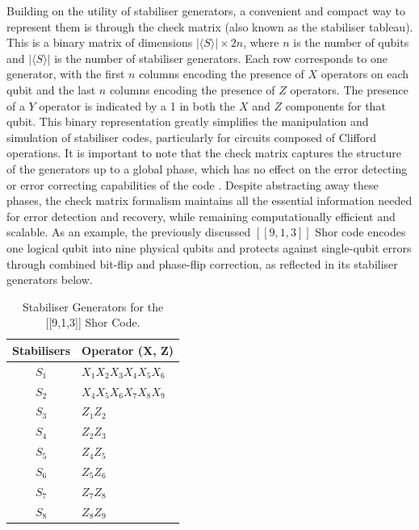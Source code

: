 Building on the utility of stabiliser generators, a convenient and compact way to represent them is through the check matrix (also known as the stabiliser tableau). This is a binary matrix of dimensions \(|\langle S \rangle | \times 2n\), where \(n\) is the number of qubits and \(|\langle S \rangle |\) is the number of stabiliser generators. Each row corresponds to one generator, with the first \(n\) columns encoding the presence of \(X\) operators on each qubit and the last \(n\) columns encoding the presence of \(Z\) operators. The presence of a \(Y\) operator is indicated by a 1 in both the \(X\) and \(Z\) components for that qubit. This binary representation greatly simplifies the manipulation and simulation of stabiliser codes, particularly for circuits composed of Clifford operations. It is important to note that the check matrix captures the structure of the generators up to a global phase, which has no effect on the error detecting or error correcting capabilities of the code \cite{webster2024engineeringquantumerrorcorrection}. Despite abstracting away these phases, the check matrix formalism maintains all the essential information needed for error detection and recovery, while remaining computationally efficient and scalable. As an example, the previously discussed \([[9,1,3]]\) Shor code encodes one logical qubit into nine physical qubits and protects against single-qubit errors through combined bit-flip and phase-flip correction, as reflected in its stabiliser generators below.

\begin{table}[h]
\centering
\begin{tabular}{c l}
\toprule
\textbf{Stabilisers } & \textbf{Operator (X, Z)} \\
\midrule
\(S_1\) & \( X_1 X_2 X_3 X_4 X_5 X_6 \) \\
\(S_2\) & \( X_4 X_5 X_6 X_7 X_8 X_9 \) \\
\(S_3\) & \( Z_1 Z_2 \) \\
\(S_4\) & \( Z_2 Z_3 \) \\
\(S_5\) & \( Z_4 Z_5 \) \\
\(S_6\) & \( Z_5 Z_6 \) \\
\(S_7\) & \( Z_7 Z_8 \) \\
\(S_8\) & \( Z_8 Z_9 \) \\
\bottomrule
\end{tabular}
\caption{Stabiliser Generators for the [[9,1,3]] Shor Code.}
\label{tab:shor code generators}
\end{table}

